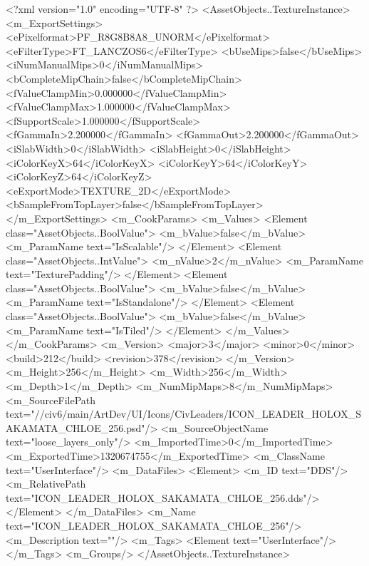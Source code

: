 <?xml version="1.0" encoding="UTF-8" ?>
<AssetObjects..TextureInstance>
	<m_ExportSettings>
		<ePixelformat>PF_R8G8B8A8_UNORM</ePixelformat>
		<eFilterType>FT_LANCZOS6</eFilterType>
		<bUseMips>false</bUseMips>
		<iNumManualMips>0</iNumManualMips>
		<bCompleteMipChain>false</bCompleteMipChain>
		<fValueClampMin>0.000000</fValueClampMin>
		<fValueClampMax>1.000000</fValueClampMax>
		<fSupportScale>1.000000</fSupportScale>
		<fGammaIn>2.200000</fGammaIn>
		<fGammaOut>2.200000</fGammaOut>
		<iSlabWidth>0</iSlabWidth>
		<iSlabHeight>0</iSlabHeight>
		<iColorKeyX>64</iColorKeyX>
		<iColorKeyY>64</iColorKeyY>
		<iColorKeyZ>64</iColorKeyZ>
		<eExportMode>TEXTURE_2D</eExportMode>
		<bSampleFromTopLayer>false</bSampleFromTopLayer>
	</m_ExportSettings>
	<m_CookParams>
		<m_Values>
			<Element class="AssetObjects..BoolValue">
				<m_bValue>false</m_bValue>
				<m_ParamName text="IsScalable"/>
			</Element>
			<Element class="AssetObjects..IntValue">
				<m_nValue>2</m_nValue>
				<m_ParamName text="TexturePadding"/>
			</Element>
			<Element class="AssetObjects..BoolValue">
				<m_bValue>false</m_bValue>
				<m_ParamName text="IsStandalone"/>
			</Element>
			<Element class="AssetObjects..BoolValue">
				<m_bValue>false</m_bValue>
				<m_ParamName text="IsTiled"/>
			</Element>
		</m_Values>
	</m_CookParams>
	<m_Version>
		<major>3</major>
		<minor>0</minor>
		<build>212</build>
		<revision>378</revision>
	</m_Version>
	<m_Height>256</m_Height>
	<m_Width>256</m_Width>
	<m_Depth>1</m_Depth>
	<m_NumMipMaps>8</m_NumMipMaps>
	<m_SourceFilePath text="//civ6/main/ArtDev/UI/Icons/CivLeaders/ICON_LEADER_HOLOX_SAKAMATA_CHLOE_256.psd"/>
	<m_SourceObjectName text="loose_layers_only"/>
	<m_ImportedTime>0</m_ImportedTime>
	<m_ExportedTime>1320674755</m_ExportedTime>
	<m_ClassName text="UserInterface"/>
	<m_DataFiles>
		<Element>
			<m_ID text="DDS"/>
			<m_RelativePath text="ICON_LEADER_HOLOX_SAKAMATA_CHLOE_256.dds"/>
		</Element>
	</m_DataFiles>
	<m_Name text="ICON_LEADER_HOLOX_SAKAMATA_CHLOE_256"/>
	<m_Description text=""/>
	<m_Tags>
		<Element text="UserInterface"/>
	</m_Tags>
	<m_Groups/>
</AssetObjects..TextureInstance>


